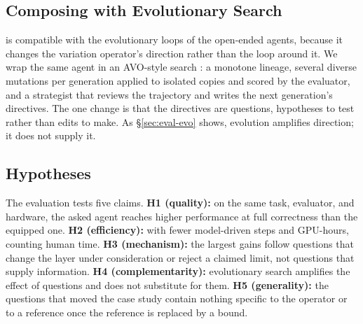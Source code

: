 \subsection{Composing with Evolutionary Search}
\label{sec:workflow-evo}

\sys is compatible with the evolutionary loops of the open-ended agents, because it changes the
variation operator's direction rather than the loop around it. We wrap the same agent in an
AVO-style search \cite{chen2026avo}: a monotone lineage, several diverse mutations per generation
applied to isolated copies and scored by the evaluator, and a strategist that reviews the trajectory
and writes the next generation's directives. The one change is that the directives are questions,
hypotheses to test rather than edits to make. As \S\ref{sec:eval-evo} shows, evolution amplifies direction; it does not
supply it.

\subsection{Hypotheses}
\label{sec:hypotheses}

The evaluation tests five claims. \textbf{H1 (quality):} on the same task, evaluator, and hardware,
the asked agent reaches higher performance at full correctness than the equipped one.
\textbf{H2 (efficiency):} with fewer model-driven steps and GPU-hours, counting human time.
\textbf{H3 (mechanism):} the largest gains follow questions that change the layer under
consideration or reject a claimed limit, not questions that supply information.
\textbf{H4 (complementarity):} evolutionary search amplifies the effect of questions and does not
substitute for them. \textbf{H5 (generality):} the questions that moved the case study contain
nothing specific to the operator or to a reference once the reference is replaced by a bound.
